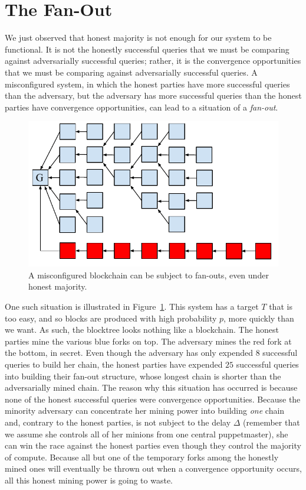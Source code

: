 \section{The Fan-Out}

We just observed that honest majority is not enough for our system to be functional. It is not
the honestly successful queries that we must be comparing against adversarially successful queries;
rather, it is the convergence opportunities that we must be comparing against adversarially successful
queries. A misconfigured system, in which the honest parties have more successful queries than the
adversary, but the adversary has more successful queries than the honest parties have convergence
opportunities, can lead to a situation of a \emph{fan-out}.

\begin{figure}[h]
    \centering
    \includegraphics[width=0.8 \columnwidth,keepaspectratio]{figures/fan-out.pdf}
    \caption{A misconfigured blockchain can be subject to fan-outs, even under honest majority.}
    \label{fig.fan-out}
\end{figure}

One such situation is illustrated in Figure~\ref{fig.fan-out}. This system has a target $T$
that is too easy, and so blocks are produced with high probability $p$, more quickly than we
want. As such, the blocktree looks nothing like a blockchain. The honest parties mine the
various blue forks on top. The adversary mines the red fork at the bottom, in secret.
Even though the adversary has only expended $8$ successful queries to build her chain,
the honest parties have expended $25$ successful queries into building their fan-out
structure, whose longest chain is shorter than the adversarially mined chain. The reason
why this situation has occurred is because none of the honest successful queries were
convergence opportunities. Because the minority adversary can concentrate her mining
power into building \emph{one} chain and, contrary to the honest parties, is not subject
to the delay $\Delta$ (remember that we assume she controls all of her minions from one
central puppetmaster), she can win the race against the honest parties even though they
control the majority of compute. Because all but one of the temporary forks among the
honestly mined ones will eventually be thrown out when a convergence opportunity occurs,
all this honest mining power is going to waste.

